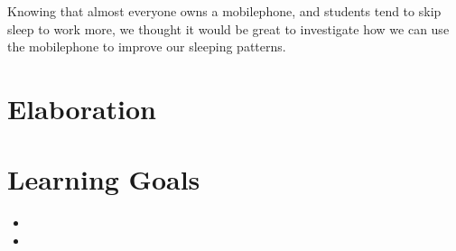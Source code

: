 \documentclass[12pt]{article}
\begin{document}
Knowing that almost everyone owns a mobilephone, and students tend to skip sleep to work more,
we thought it would be great to investigate how we can use the mobilephone to improve our 
sleeping patterns. 

\section{Elaboration}


\section{Learning Goals}
	\begin{itemize}
		\item 
		\item 
	\end{itemize}

%




\end{document}
